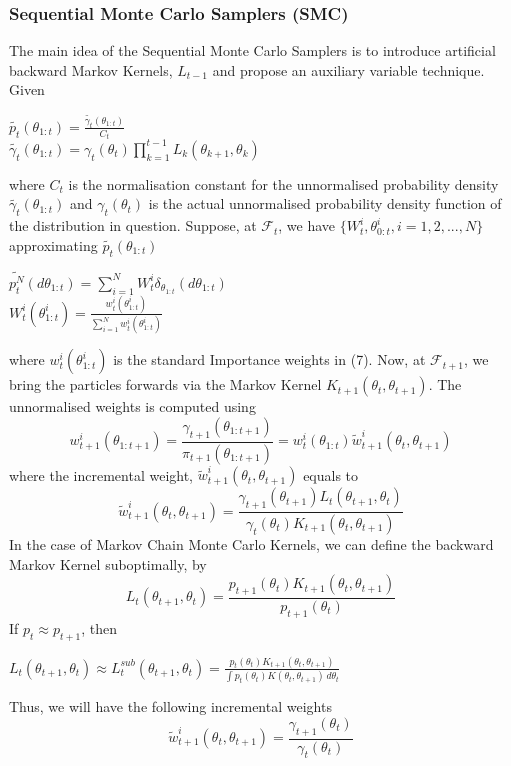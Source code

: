 \documentclass[11pt]{article}
\theoremstyle{definition}
\begin{document}
\subsubsection{Sequential Monte Carlo Samplers (SMC)}
The main idea of the Sequential Monte Carlo Samplers is to introduce artificial backward Markov Kernels, $L_{t-1}$ and propose an auxiliary variable technique. Given
\begin{center}
$\widetilde{p_{t}}(\theta_{1:t}) = \frac{\widetilde{\gamma_{t}}(\theta_{1:t})}{C_{t}}$\\
$\widetilde{\gamma_{t}}(\theta_{1:t}) = \gamma_{t}(\theta_{t})\prod_{k=1}^{t-1} L_{k}(\theta_{k+1},\theta_{k})$
\end{center}
where $C_{t}$ is the normalisation constant for the unnormalised probability density $\widetilde{\gamma_{t}}(\theta_{1:t})$ and $\gamma_{t}(\theta_{t})$ is the actual unnormalised probability density function of the distribution in question. Suppose, at $\mathcal{F}_{t}$, we have $\{W^{i}_{t},\theta_{0:t}^{i},i=1,2,...,N\}$ approximating $\widetilde{p_{t}}(\theta_{1:t})$
\begin{center}
$\widetilde{p_{t}^{N}}(d\theta_{1:t})=\sum_{i=1}^{N} W^{i}_{t} \delta_{\theta_{1:t}}(d\theta_{1:t})$\\
$W^{i}_{t}(\theta^{i}_{1:t}) = \frac{w^{i}_{t}(\theta^{i}_{1:t})}{\sum_{i=1}^{N} w^{i}_{t}(\theta^{i}_{1:t})}$
\end{center}
where $w_{t}^{i}(\theta_{1:t}^{i})$ is the standard Importance weights in (7). Now, at $\mathcal{F}_{t+1}$, we bring the particles forwards via the Markov Kernel $K_{t+1}(\theta_{t},\theta_{t+1})$. The unnormalised weights is computed using
\begin{equation}
w^{i}_{t+1}(\theta_{1:t+1}) = \frac{\gamma_{t+1}(\theta_{1:t+1})}{\pi_{t+1}(\theta_{1:t+1})} = w^{i}_{t}(\theta_{1:t})\widetilde{w}^{i}_{t+1}(\theta_{t},\theta_{t+1})
\end{equation}
where the incremental weight, $\widetilde{w}^{i}_{t+1}(\theta_{t},\theta_{t+1})$ equals to
\begin{equation}
\widetilde{w}^{i}_{t+1}(\theta_{t},\theta_{t+1}) = \frac{\gamma_{t+1}(\theta_{t+1})L_{t}(\theta_{t+1},\theta_{t})}{\gamma_{t}(\theta_{t})K_{t+1}(\theta_{t},\theta_{t+1})}
\end{equation}
In the case of Markov Chain Monte Carlo Kernels, we can define the backward Markov Kernel suboptimally, by
\begin{equation}
L_{t}(\theta_{t+1},\theta_{t}) = \frac{p_{t+1}(\theta_{t})K_{t+1}(\theta_{t},\theta_{t+1})}{p_{t+1}(\theta_{t})}
\end{equation}
If $p_{t} \approx p_{t+1}$, then
\begin{center}
$L_{t}(\theta_{t+1},\theta_{t})  \approx L^{sub}_{t}(\theta_{t+1},\theta_{t})  = \frac{p_{t}(\theta_{t})K_{t+1}(\theta_{t},\theta_{t+1})}{\int p_{t}(\theta_{t})K(\theta_{t},\theta_{t+1})\,d\theta_{t}}$
\end{center}
Thus, we will have the following incremental weights
\begin{equation}
\widetilde{w}_{t+1}^{i}(\theta_{t},\theta_{t+1}) = \frac{\gamma_{t+1}(\theta_{t})}{\gamma_{t}(\theta_{t})}
\end{equation}
\end{document}
